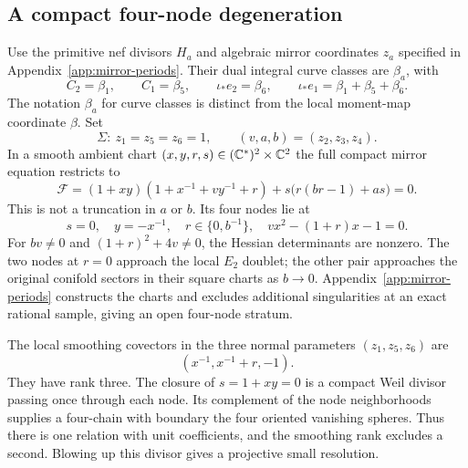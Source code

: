 \subsection{A compact four-node degeneration}
\label{subsec:x9-mirror-periods}

Use the primitive nef divisors $H_a$ and algebraic mirror
coordinates $z_a$ specified in Appendix~\ref{app:mirror-periods}.
Their dual integral curve classes are $\beta_a$, with
\begin{equation}
 C_2=\beta_1,\qquad C_1=\beta_5,\qquad
 \iota_*e_2=\beta_6,\qquad
 \iota_*e_1=\beta_1+\beta_5+\beta_6.
 \label{eq:x9-electric-nef-charges}
\end{equation}
The notation $\beta_a$ for curve classes is distinct from the
local moment-map coordinate $\beta$. Set
\begin{equation}
 \Sigma:\ z_1=z_5=z_6=1,\qquad (v,a,b)=(z_2,z_3,z_4).
 \label{eq:x9-finite-bulk-locus}
\end{equation}
In a smooth ambient chart $(x,y,r,s)\in(\mathbb C^*)^2\times\mathbb C^2$
the full compact mirror equation restricts to
\begin{equation}
 \mathcal F=(1+xy)(1+x^{-1}+vy^{-1}+r)
             +s\bigl(r(br-1)+as\bigr)=0.
 \label{eq:x9-finite-bulk-factorization}
\end{equation}
This is not a truncation in $a$ or $b$. Its four nodes lie at
\begin{equation}
 s=0,\quad y=-x^{-1},\quad r\in\{0,b^{-1}\},\quad
 vx^2-(1+r)x-1=0.
 \label{eq:x9-finite-bulk-nodes}
\end{equation}
For $bv\ne0$ and $(1+r)^2+4v\ne0$, the Hessian determinants
are nonzero. The two nodes at $r=0$ approach the local $E_2$
doublet; the other pair approaches the original conifold sectors
in their square charts as $b\to0$. Appendix~\ref{app:mirror-periods}
constructs the charts and excludes additional singularities at
an exact rational sample, giving an open four-node stratum.

The local smoothing covectors in the three normal parameters
$(z_1,z_5,z_6)$ are
\begin{equation}
 (x^{-1},x^{-1}+r,-1).
 \label{eq:x9-finite-bulk-smoothing}
\end{equation}
They have rank three. The closure of $s=1+xy=0$ is a compact
Weil divisor passing once through each node. Its complement of
the node neighborhoods supplies a four-chain with boundary the
four oriented vanishing spheres. Thus there is one relation with
unit coefficients, and the smoothing rank excludes a second.
Blowing up this divisor gives a projective small resolution.

